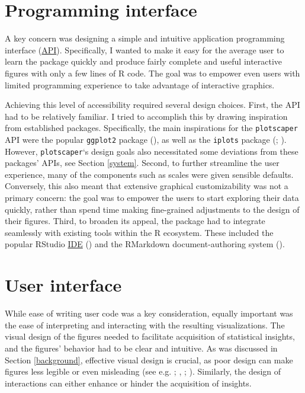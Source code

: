 \documentclass[
  openany]{book}
\theoremstyle{definition}
\theoremstyle{definition}
\theoremstyle{definition}
\theoremstyle{definition}
\theoremstyle{remark}
\begin{document}
\section{Programming interface}\label{programming-interface}

A key concern was designing a simple and intuitive application programming interface (\hyperref[API]{API}). Specifically, I wanted to make it easy for the average user to learn the package quickly and produce fairly complete and useful interactive figures with only a few lines of R code. The goal was to empower even users with limited programming experience to take advantage of interactive graphics.

Achieving this level of accessibility required several design choices. First, the API had to be relatively familiar. I tried to accomplish this by drawing inspiration from established packages. Specifically, the main inspirations for the \texttt{plotscaper} API were the popular \texttt{ggplot2} package (), as well as the \texttt{iplots} package (; ). However, \texttt{plotscaper}`s design goals also necessitated some deviations from these packages' APIs, see Section \ref{system}. Second, to further streamline the user experience, many of the components such as scales were given sensible defaults. Conversely, this also meant that extensive graphical customizability was not a primary concern: the goal was to empower the users to start exploring their data quickly, rather than spend time making fine-grained adjustments to the design of their figures. Third, to broaden its appeal, the package had to integrate seamlessly with existing tools within the R ecosystem. These included the popular RStudio \hyperref[ide]{IDE} () and the RMarkdown document-authoring system ().

\section{User interface}\label{user-interface}

While ease of writing user code was a key consideration, equally important was the ease of interpreting and interacting with the resulting visualizations. The visual design of the figures needed to facilitate acquisition of statistical insights, and the figures' behavior had to be clear and intuitive. As was discussed in Section \ref{background}, effective visual design is crucial, as poor design can make figures less legible or even misleading (see e.g. ; , ; ). Similarly, the design of interactions can either enhance or hinder the acquisition of insights.
\end{document}
